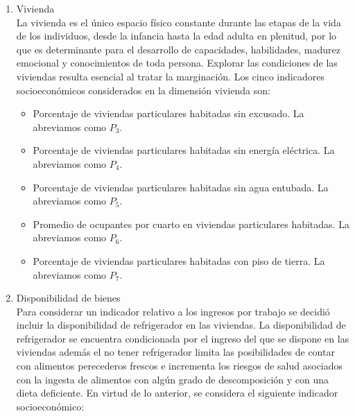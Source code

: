 \documentclass[paper=letter, fontsize=11pt]{scrartcl}
\numberwithin{equation}{section} %
\numberwithin{figure}{section} %
\numberwithin{table}{section} %
\begin{document}
\begin{enumerate}
\begin{enumerate}
\item Vivienda\\
La vivienda es el único espacio físico constante durante las etapas de la vida de los individuos,
desde la infancia hasta la edad adulta en plenitud, por lo que es determinante
para el desarrollo de capacidades, habilidades, madurez emocional y conocimientos
de toda persona. Explorar las condiciones de las viviendas resulta
esencial al tratar la marginación. Los cinco indicadores socioeconómicos considerados
en la dimensión vivienda son:
\begin{itemize}
\item Porcentaje de viviendas particulares habitadas sin excusado. La abreviamos como $P_3$.
\item Porcentaje de viviendas particulares habitadas sin energía eléctrica. La abreviamos como $P_4$.
\item Porcentaje de viviendas particulares habitadas sin agua entubada. La abreviamos como $P_5$.
\item Promedio de ocupantes por cuarto en viviendas particulares habitadas. La abreviamos como $P_6$.
\item Porcentaje de viviendas particulares habitadas con piso de tierra. La abreviamos como $P_7$.
\end{itemize}

\item Disponibilidad de bienes\\
Para considerar un indicador relativo a los ingresos por trabajo se decidió incluir la disponibilidad de refrigerador en las viviendas. La disponibilidad de refrigerador se encuentra condicionada por el ingreso
del que se dispone en las viviendas además el no tener refrigerador limita las posibilidades de contar con alimentos perecederos frescos e incrementa los riesgos de salud asociados con la
ingesta de alimentos con algún grado de descomposición y con una dieta deficiente.
En virtud de lo anterior, se considera el siguiente indicador socioeconómico:


\end{enumerate}
\end{enumerate}
\end{document}

